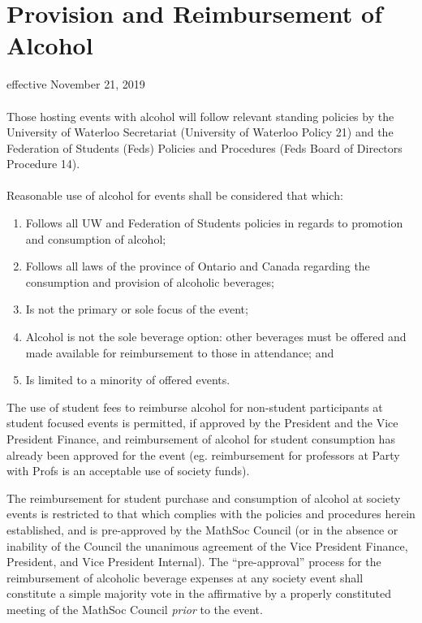 \section{Provision and Reimbursement of Alcohol}
effective November 21, 2019
\paragraph{}

Those hosting events with alcohol will follow relevant standing policies by the University of Waterloo Secretariat (University of Waterloo Policy 21) and the Federation of Students (Feds) Policies and Procedures (Feds Board of Directors Procedure 14).
\paragraph{}
Reasonable use of alcohol for events shall be considered that which:
\begin{enumerate}
\item Follows all UW and Federation of Students policies in regards to promotion and consumption of alcohol;
\item Follows all laws of the province of Ontario and Canada regarding the consumption and provision of alcoholic beverages;
\item Is not the primary or sole focus of the event;
\item Alcohol is not the sole beverage option: other beverages must be offered and made available for reimbursement to those in attendance; and
\item Is limited to a minority of offered events.
\end{enumerate}

The use of student fees to reimburse alcohol for non-student participants at student focused events is permitted, if approved by the President and the Vice President Finance, and reimbursement of alcohol for student consumption has already been approved for the event (eg. reimbursement for professors at Party with Profs is an acceptable use of society funds).

The reimbursement for student purchase and consumption of alcohol at society events is restricted to that which complies with the policies and procedures herein established, and is pre-approved by the MathSoc Council (or in the absence or inability of the Council the unanimous agreement of the Vice President Finance, President, and Vice President Internal). The “pre-approval” process for the reimbursement of alcoholic beverage expenses at any society event shall constitute a simple majority vote in the affirmative by a properly constituted meeting of the MathSoc Council \textit{prior} to the event.

